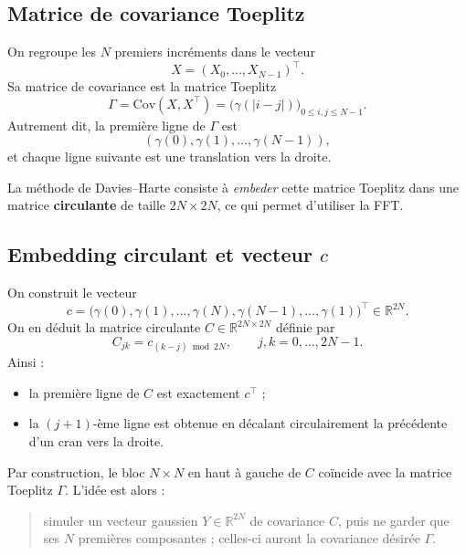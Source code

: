 \documentclass[11pt,a4paper]{article}
\newcommand{\R}{\mathbb{R}}
\newcommand{\Cov}{\mathrm{Cov}}
\newcommand{\1}{\mathbf{1}}
\begin{document}
\subsection{Matrice de covariance Toeplitz}

On regroupe les $N$ premiers incréments dans le vecteur
\[
  X = (X_0,\dots,X_{N-1})^\top.
\]
Sa matrice de covariance est la matrice Toeplitz
\begin{equation}
  \Gamma
  = \Cov(X,X^\top)
  = \bigl(\gamma(|i-j|)\bigr)_{0\le i,j\le N-1}.
\end{equation}
Autrement dit, la première ligne de $\Gamma$ est
\[
  (\gamma(0),\gamma(1),\dots,\gamma(N-1)),
\]
et chaque ligne suivante est une translation vers la droite.

La méthode de Davies--Harte consiste à \emph{embeder} cette matrice Toeplitz
dans une matrice \textbf{circulante} de taille $2N\times 2N$, ce qui
permet d'utiliser la FFT.

\subsection{Embedding circulant et vecteur $c$}

On construit le vecteur
\begin{equation}
  c
  = \bigl(
    \gamma(0),\gamma(1),\dots,\gamma(N),\gamma(N-1),\dots,\gamma(1)
    \bigr)^\top
  \in\R^{2N}.
\end{equation}
On en déduit la matrice circulante $C\in\R^{2N\times 2N}$ définie par
\begin{equation}
  C_{jk} = c_{(k-j)\bmod 2N},
  \qquad j,k = 0,\dots,2N-1.
\end{equation}
Ainsi :
\begin{itemize}
  \item la première ligne de $C$ est exactement $c^\top$ ;
  \item la $(j+1)$-ème ligne est obtenue en décalant circulairement la
        précédente d'un cran vers la droite.
\end{itemize}

Par construction, le bloc $N\times N$ en haut à gauche de $C$ coïncide
avec la matrice Toeplitz $\Gamma$.
L'idée est alors :
\begin{quote}
  simuler un vecteur gaussien $Y\in\R^{2N}$ de covariance $C$,
  puis ne garder que ses $N$ premières composantes ; celles-ci auront
  la covariance désirée $\Gamma$.
\end{quote}
\end{document}
